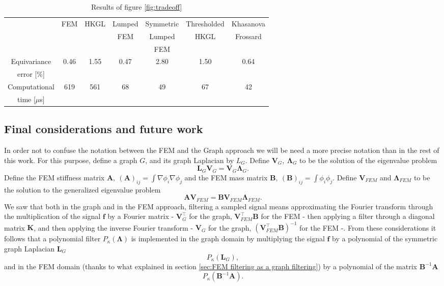 \begin{table}[h!]
	\centering
	\footnotesize
	\begin{tabular}{ c|c |c|c|c|c|c } 
		& FEM & HKGL & Lumped & Symmetric & Thresholded & Khasanova  \\
		&&&FEM&Lumped&HKGL&Frossard\\
		&&&& FEM&&\\
		\hline
		Equivariance & 0.46 & 1.55 & 0.47 & 2.80& 1.50 & 0.64\\
		error [\%]&&&&&&\\ \hline
		Computational & 619 & 561 & 68 & 49 & 67 & 42 \\
		 time [$\mu$s]&&&&&&
	\end{tabular}
	\caption{\label{table:res}Results of figure \ref{fig:tradeoff}}
\end{table}

\subsection{Final considerations and future work}
In order not to confuse the notation between the FEM and the Graph approach we will be need a more precise notation than in the rest of this work. For this purpose, define a graph $G$, and its graph Laplacian by $L_G$. Define $\mathbf V_G,\ \mathbf \Lambda_G$ to be the solution of the eigenvalue problem
$$
\mathbf L_G \mathbf V_G = \mathbf V_G\mathbf  \Lambda_G.
$$
Define the FEM stiffness matrix $\mathbf A,\ (\mathbf A)_{ij} = \int\nabla\phi_i\nabla\phi_j$ and the FEM mass matrix $\mathbf B,\ (\mathbf B)_{ij} = \int\phi_i\phi_j$. Define $\mathbf V_{FEM}$ and $\mathbf \Lambda_{FEM}$ to be the solution to the generalized eigenvalue problem 
$$
\mathbf A\mathbf V_{FEM} =\mathbf  B\mathbf V_{FEM}\mathbf \Lambda_{FEM}.
$$
We saw that both in the graph and in the FEM approach, filtering a sampled signal means approximating the Fourier transform through the multiplication of the signal $\mathbf f$ by a Fourier matrix - $\mathbf V_G^\intercal$ for the graph, $\mathbf V_{FEM}^\intercal\mathbf B$ for the FEM - then applying a filter through a diagonal matrix $\mathbf K$, and then applying the inverse Fourier transform - $\mathbf V_G$ for the graph, $(\mathbf V_{FEM}^\intercal\mathbf B)^{-1}$ for the FEM -. From these considerations it follows that a polynomial filter $P_\kappa(\mathbf \Lambda)$ is implemented in the graph domain by multiplying the signal $\mathbf f$ by a polynomial of the symmetric graph Laplacian $\mathbf L_G$
$$
P_\kappa(\mathbf L_G),
$$
and in the FEM domain (thanks to what explained in section \ref{sec:FEM filtering as a graph filtering}) by a polynomial of the matrix $\mathbf B^{-1}\mathbf A$
$$P_\kappa(\mathbf B^{-1}\mathbf A).
$$

